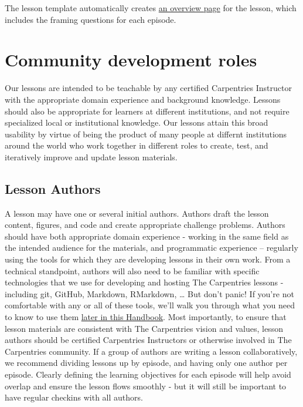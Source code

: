 \documentclass[]{book}
\begin{document}
The lesson template automatically creates \href{https://datacarpentry.org/shell-genomics/}{an overview page} for the lesson, which includes the framing
questions for each episode.

\hypertarget{community-development-roles}{%
\chapter{Community development roles}\label{community-development-roles}}

Our lessons are intended to be teachable by any certified
Carpentries Instructor with the appropriate domain experience
and background knowledge. Lessons should also be appropriate for
learners at different institutions, and not require specialized
local or institutional knowledge. Our lessons attain this
broad usability by virtue of being the product of many people
at differnt institutions around the world who work together
in different roles to create, test, and iteratively improve and
update lesson materials.

\hypertarget{lesson-authors}{%
\section{Lesson Authors}\label{lesson-authors}}

A lesson may have one or several initial authors. Authors draft
the lesson content, figures, and code and create appropriate challenge problems. Authors should have both appropriate domain
experience - working in the same field as the intended audience for the materials,
and programmatic experience -- regularly using the tools for which they are
developing lessons in their own work. From a technical standpoint, authors
will also need to be familiar with specific technologies that we use for
developing and hosting The Carpentries lessons - including git, GitHub, Markdown,
RMarkdown, \ldots{} But don't panic! If you're not comfortable with any or all of these
tools, we'll walk you through what you need to know to use them \protect\hyperlink{technological-introductions}{later in this
Handbook}. Most importantly, to ensure that lesson materials are consistent with The Carpentries vision and
values,
lesson authors should be certified Carpentries Instructors or otherwise involved
in The Carpentries community. If a group of authors are writing a lesson
collaboratively, we recommend dividing lessons up by episode, and having only one
author per episode. Clearly defining the learning objectives for each episode
will help avoid overlap and ensure the lesson flows smoothly - but it will
still be important to have regular checkins with all authors.
\end{document}
